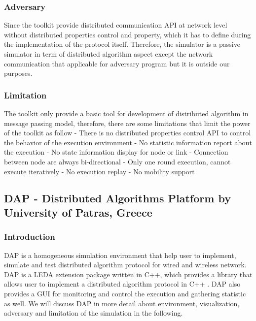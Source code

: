 \subsubsection{Adversary}
Since the toolkit provide distributed communication API at network level without distributed properties control and property, which it has to define during the implementation of  the protocol itself. Therefore, the simulator is a passive simulator in term of distributed algorithm aspect except the network communication that applicable for adversary program but it is outside our purposes.

\subsubsection{Limitation}
The toolkit only provide a basic tool for development of distributed algorithm in message passing model, therefore, there are some limitations that limit the power of the toolkit as follow
- There is no distributed properties control API to control the behavior of the execution environment
- No statistic information report about the execution
- No state information display for node or link
- Connection between node are always bi-directional
- Only one round execution, cannot execute iteratively
- No execution replay
- No mobility support


\subsection{DAP - Distributed Algorithms Platform by University of Patras, Greece}

\subsubsection{Introduction}
DAP is a homogeneous simulation environment that help user to implement, simulate and test distributed algorithm protocol for wired and wireless network. DAP is a LEDA extension package written in C++, which provides a library that allows user to implement a distributed algorithm protocol in C++ . DAP also provides a GUI for monitoring and control the execution and gathering statistic as well. We will discuss DAP in more detail about environment, visualization, adversary and limitation of the simulation in the following.

